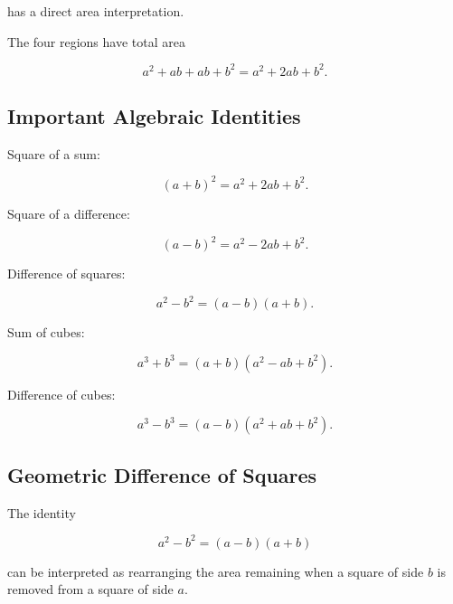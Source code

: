 has a direct area interpretation.

\begin{center}
\end{center}

The four regions have total area

\[ a^2+ab+ab+b^2=a^2+2ab+b^2. \]

\subsection{Important Algebraic Identities}
\label{subsec:important-algebraic-identities}

Square of a sum:

\[ (a+b)^2=a^2+2ab+b^2. \]

Square of a difference:

\[ (a-b)^2=a^2-2ab+b^2. \]

Difference of squares:

\[ a^2-b^2=(a-b)(a+b). \]

Sum of cubes:

\[ a^3+b^3=(a+b)(a^2-ab+b^2). \]

Difference of cubes:

\[ a^3-b^3=(a-b)(a^2+ab+b^2). \]

\subsection{Geometric Difference of Squares}
\label{subsec:geometric-difference-squares}

The identity

\[ a^2-b^2=(a-b)(a+b) \]

can be interpreted as rearranging the area remaining when a square of side
\(b\) is removed from a square of side \(a\).

